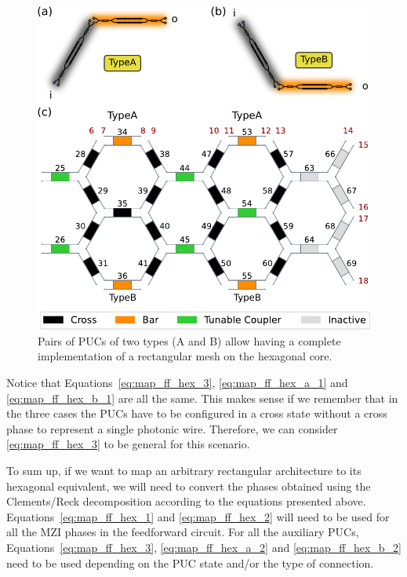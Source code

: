 \begin{figure}[t]
	\centering
	\includegraphics{figures/ch4-pucs_type_a_b.pdf}
	\caption{
		Pairs of PUCs of two types (A and B) allow having a complete implementation of a rectangular mesh on the hexagonal core.
	}\label{fig:ch4-pucs_type_a_b}
\end{figure}

Notice that Equations~\eqref{eq:map_ff_hex_3}, \eqref{eq:map_ff_hex_a_1} and \eqref{eq:map_ff_hex_b_1} are all the same.
This makes sense if we remember that in the three cases the PUCs have to be configured in a cross state without a cross phase to represent a single photonic wire.
Therefore, we can consider \eqref{eq:map_ff_hex_3} to be general for this scenario.

To sum up, if we want to map an arbitrary rectangular architecture to its hexagonal equivalent, we will need to convert the phases obtained using the Clements/Reck decomposition according to the equations presented above.
Equations~\eqref{eq:map_ff_hex_1} and \eqref{eq:map_ff_hex_2} will need to be used for all the MZI phases in the feedforward circuit.
For all the auxiliary PUCs, Equations~\eqref{eq:map_ff_hex_3}, \eqref{eq:map_ff_hex_a_2} and \eqref{eq:map_ff_hex_b_2} need to be used depending on the PUC state and/or the type of connection.

